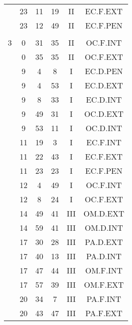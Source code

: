 \documentclass[12pt, a4paper]{article}
\begin{document}
\begin{multicols}{3}
{\begin{tabular}{c c c c c c}
	 	 	 	 & 23 & 11 & 19 & II & EC.F.EXT\\%
	 	 	 	 & 23 & 12 & 49 & II & EC.F.PEN\\%
	 	 	 	 & & & & & \\%
	 	 	 	3 & 0 & 31 & 35 & II & OC.F.INT\\%
	 	 	 	 & 0 & 35 & 35 & II & OC.F.EXT\\%
	 	 	 	 & 9 & 4 & 8 & I & EC.D.PEN\\%
	 	 	 	 & 9 & 4 & 53 & I & EC.D.EXT\\%
	 	 	 	 & 9 & 8 & 33 & I & EC.D.INT\\%
	 	 	 	 & 9 & 49 & 31 & I & OC.D.EXT\\%
	 	 	 	 & 9 & 53 & 11 & I & OC.D.INT\\%
	 	 	 	 & 11 & 19 & 3 & I & EC.F.INT\\%
	 	 	 	 & 11 & 22 & 43 & I & EC.F.EXT\\%
	 	 	 	 & 11 & 23 & 23 & I & EC.F.PEN\\%
	 	 	 	 & 12 & 4 & 49 & I & OC.F.INT\\%
	 	 	 	 & 12 & 8 & 24 & I & OC.F.EXT\\%
	 	 	 	 & 14 & 49 & 41 & III & OM.D.EXT\\%
	 	 	 	 & 14 & 59 & 41 & III & OM.D.INT\\%
	 	 	 	 & 17 & 30 & 28 & III & PA.D.EXT\\%
	 	 	 	 & 17 & 40 & 13 & III & PA.D.INT\\%
	 	 	 	 & 17 & 47 & 44 & III & OM.F.INT\\%
	 	 	 	 & 17 & 57 & 39 & III & OM.F.EXT\\%
	 	 	 	 & 20 & 34 & 7 & III & PA.F.INT\\%
	 	 	 	 & 20 & 43 & 47 & III & PA.F.EXT\\%

\end{tabular}}
\end{multicols}
\end{document}
